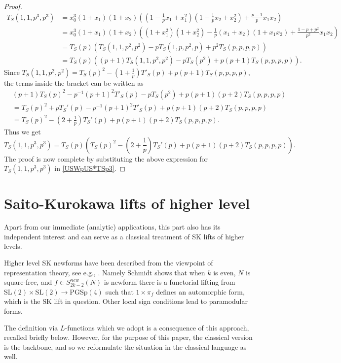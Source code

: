 \documentclass[11pt]{amsart}
\numberwithin{equation}{section}
\theoremstyle{plain}
\theoremstyle{definition}
\newcommand{\mrm}{\mathrm}
\begin{document}
\begin{proof}
\begin{align}
     T_S(1,1,p^3,p^3) &= x_0^3 (1+x_1)(1+x_2) \left( (1-\frac{1}{p }x_1 + x_1^2)(1- \frac{1}{p}x_2 + x_2^2) +\frac{p-1}{p} x_1 x_2 \right) \\
     &= x_0^3 (1+x_1)(1+x_2) \left(  (1+x_1^2)(1+x_2^2) - \frac{1}{p} (x_1+x_2)(1+x_1 x_2) +\frac{1-p+p^2}{p^2} x_1x_2 \right)\\
     &= T_S(p)\left(T_S(1,1,p^2,p^2)-pT_S(1,p,p^2,p)+p^2T_S(p,p,p,p)\right)\\
     &= T_S(p)\left((p+1)T_S(1,1,p^2,p^2)-pT_S(p^2)+p(p+1)T_S(p,p,p,p)\right).
\end{align}
Since $T_S(1,1,p^2,p^2) = T_S(p)^2- (1+\frac{1}{p})T'_S(p) +p(p+1) T_S(p,p,p,p)$, the terms inside the bracket can be written as
\begin{align}
     &(p+1)T_S(p)^2-p^{-1}(p+1)^2T'_S(p)-pT_S(p^2)+p(p+1)(p+2)T_S(p,p,p,p)\\
     &=T_S(p)^2+pT_S'(p)-p^{-1}(p+1)^2T'_S(p)+p(p+1)(p+2)T_S(p,p,p,p)\\
     &= T_S(p)^2-\left(2+\frac{1}{p}\right) T_S'(p)+p(p+1)(p+2)T_S(p,p,p,p).
\end{align}
Thus we get
\begin{equation}
    T_S(1,1,p^3,p^3)= T_S(p)\left(T_S(p)^2-\left(2+\frac{1}{p}\right) T_S'(p)+p(p+1)(p+2)T_S(p,p,p,p) \right).
\end{equation}
The proof is now complete by substituting the above expression for $T_S(1,1,p^3,p^3)$ in \eqref{USWpUS*TSp3}.
\end{proof}

\section{Saito-Kurokawa lifts of higher level} \label{sec:SKintro}
Apart from  our immediate (analytic) applications, this part also has its independent interest and can serve as a classical treatment of SK lifts of higher levels.

Higher level SK newforms have been described from the viewpoint of representation theory, see e.g., \cite{schmidt-SKlift}.
Namely Schmidt shows that when $k$ is even, $N$ is square-free, and $f \in S_{2k-2}^{new}(N)$ is newform there is a functorial lifting from $\mrm{SL}(2) \times \mrm{SL}(2) \rightarrow \mrm{PGSp}(4)$ such that $1 \times \pi_f$ defines an automorphic form, which is the SK lift in question. Other local sign conditions lead to paramodular forms.

The definition via $L$-functions which we adopt is a consequence of this approach, recalled briefly below. However, for the purpose of this paper, the classical version is the backbone, and so we reformulate the situation in the classical language as well. 
\end{document}
